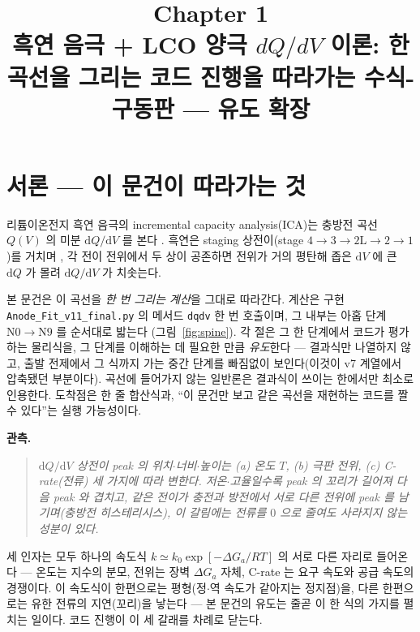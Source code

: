 \documentclass[11pt,a4paper]{article}
\title{\textbf{\LARGE Chapter 1}\\[0.35em]\Large 흑연 음극 + LCO 양극 $dQ/dV$ 이론: 한 곡선을 그리는 코드 진행을 따라가는 수식-구동판 — 유도 확장}
\author{}
\date{}
\newcommand{\dd}{\mathrm{d}}
\newcommand{\code}[1]{\texttt{#1}}
\begin{document}
\maketitle

\section*{서론 — 이 문건이 따라가는 것}
리튬이온전지 흑연 음극의 incremental capacity analysis(ICA)는 충방전 곡선 $Q(V)$ 의 미분
$\dd Q/\dd V$ 를 본다 \cite{bloom2005,dubarry2012}. 흑연은 staging 상전이(stage
$4\!\to\!3\!\to\!2\mathrm L\!\to\!2\!\to\!1$)를 거치며 \cite{dahn1991,ohzuku1993}, 각 전이 전위에서
두 상이 공존하면 전위가 거의 평탄해 좁은 $\dd V$ 에 큰 $\dd Q$ 가 몰려 $\dd Q/\dd V$ 가 치솟는다.

본 문건은 이 곡선을 \emph{한 번 그리는 계산}을 그대로 따라간다. 계산은 구현 \code{Anode\_Fit\_v11\_final.py}
의 메서드 \code{dqdv} 한 번 호출이며, 그 내부는 아홉 단계 $\mathrm N0\!\to\!\mathrm N9$ 를 순서대로 밟는다
(그림~\ref{fig:spine}). 각 절은 그 한 단계에서 코드가 평가하는 물리식을, 그 단계를 이해하는 데 필요한 만큼
\emph{유도}한다 — 결과식만 나열하지 않고, 출발 전제에서 그 식까지 가는 중간 단계를 빠짐없이 보인다(이것이 v7
계열에서 압축됐던 부분이다). 곡선에 들어가지 않는 일반론은 결과식이 쓰이는 한에서만 최소로 인용한다. 도착점은 한 줄
합산식과, ``이 문건만 보고 같은 곡선을 재현하는 코드를 짤 수 있다''는 실행 가능성이다.

\textbf{관측.}
\begin{quote}\itshape
$\dd Q/\dd V$ 상전이 peak 의 위치$\cdot$너비$\cdot$높이는 (a) 온도 $T$, (b) 극판 전위, (c) C-rate(전류)
세 가지에 따라 변한다. 저온$\cdot$고율일수록 peak 의 꼬리가 길어져 다음 peak 와 겹치고, 같은 전이가 충전과 방전에서
서로 다른 전위에 peak 를 남기며(충방전 히스테리시스), 이 갈림에는 전류를 $0$ 으로 줄여도 사라지지 않는 성분이 있다.
\end{quote}

세 인자는 모두 하나의 속도식 $k\simeq k_0\exp[-\Delta G_a/RT]$ 의 서로 다른 자리로 들어온다 — 온도는 지수의 분모,
전위는 장벽 $\Delta G_a$ 자체, C-rate 는 요구 속도와 공급 속도의 경쟁이다. 이 속도식이 한편으로는 평형(정$\cdot$역
속도가 같아지는 정지점)을, 다른 한편으로는 유한 전류의 지연(꼬리)을 낳는다 — 본 문건의 유도는 줄곧 이 한 식의 가지를
펼치는 일이다. 코드 진행이 이 세 갈래를 차례로 닫는다.
\end{document}
